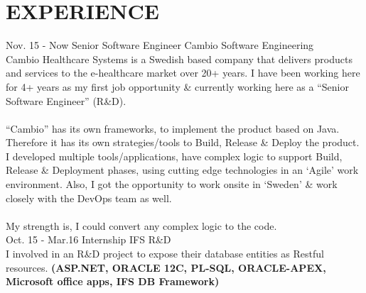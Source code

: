 \documentclass[]{cv-class}
\begin{document}
\section{EXPERIENCE}
\begin{entrylist}
  \entry
    {Nov. 15 - Now}
    {Senior Software Engineer}
    {Cambio Software Engineering}
    {   \\
        Cambio Healthcare Systems is a Swedish based company that delivers products and services to the e-healthcare market over 20+ years.
        I have been working here for 4+ years as my first job opportunity \& currently working here as a “Senior Software Engineer” (R\&D).
        \\
        \\
        “Cambio” has its own frameworks, to implement the product based on Java.
        Therefore it has its own strategies/tools to Build, Release \& Deploy the product.
        I developed multiple tools/applications, have complex logic to support Build, Release \& Deployment phases, using cutting edge technologies in an ‘Agile’ work environment.
        Also, I got the opportunity to work onsite in ‘Sweden’ \& work closely with the DevOps team as well.
        \\
        \\
        My strength is, I could convert any complex logic to the code.
    }
\\
  \entry
    {Oct. 15 - Mar.16}
    {Internship}
    {IFS R\&D}
    {   \\
        I involved in an R\&D project to expose their database entities as Restful resources.
        \textbf{(ASP.NET, ORACLE 12C, PL-SQL, ORACLE-APEX, Microsoft office apps, IFS DB Framework)}
    }
\end{entrylist}
\end{document}
